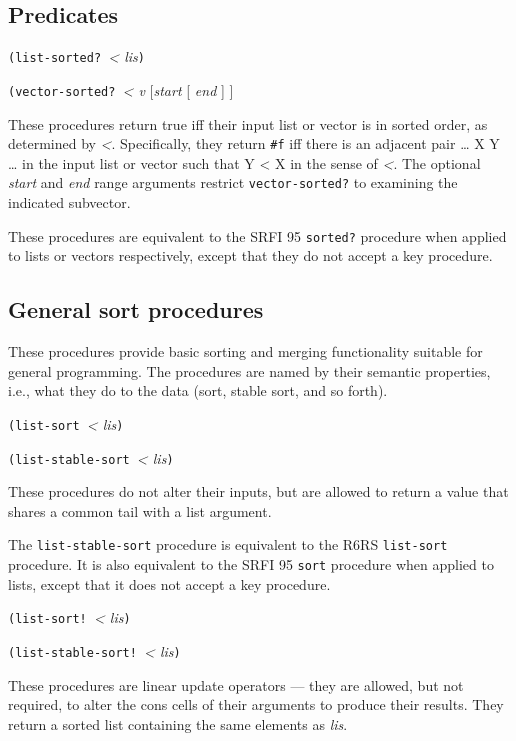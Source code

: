 \subsection{Predicates}\label{Predicates}

\texttt{(list-sorted?\ }\emph{\textless{} lis}\texttt{)}

\texttt{(vector-sorted?\ }\emph{\textless{} v} {[}\emph{start} {[}
\emph{end} {]} {]}

These procedures return true iff their input list or vector is in sorted
order, as determined by \emph{\textless{}}. Specifically, they return
\texttt{\#f} iff there is an adjacent pair \ldots{} X Y \ldots{} in the
input list or vector such that Y \textless{} X in the sense of
\emph{\textless{}}. The optional \emph{start} and \emph{end} range
arguments restrict \texttt{vector-sorted?} to examining the indicated
subvector.

These procedures are equivalent to the SRFI 95 \texttt{sorted?}
procedure when applied to lists or vectors respectively, except that
they do not accept a key procedure.

\subsection{General sort procedures}\label{Generalsortprocedures}

These procedures provide basic sorting and merging functionality
suitable for general programming. The procedures are named by their
semantic properties, i.e., what they do to the data (sort, stable sort,
and so forth).

\texttt{(list-sort\ }\emph{\textless{} lis}\texttt{)}

\texttt{(list-stable-sort\ }\emph{\textless{} lis}\texttt{)}

These procedures do not alter their inputs, but are allowed to return a
value that shares a common tail with a list argument.

The \texttt{list-stable-sort} procedure is equivalent to the R6RS
\texttt{list-sort} procedure. It is also equivalent to the SRFI 95
\texttt{sort} procedure when applied to lists, except that it does not
accept a key procedure.

\texttt{(list-sort!\ }\emph{\textless{} lis}\texttt{)}

\texttt{(list-stable-sort!\ }\emph{\textless{} lis}\texttt{)}

These procedures are linear update operators --- they are allowed, but
not required, to alter the cons cells of their arguments to produce
their results. They return a sorted list containing the same elements as
\emph{lis}.

